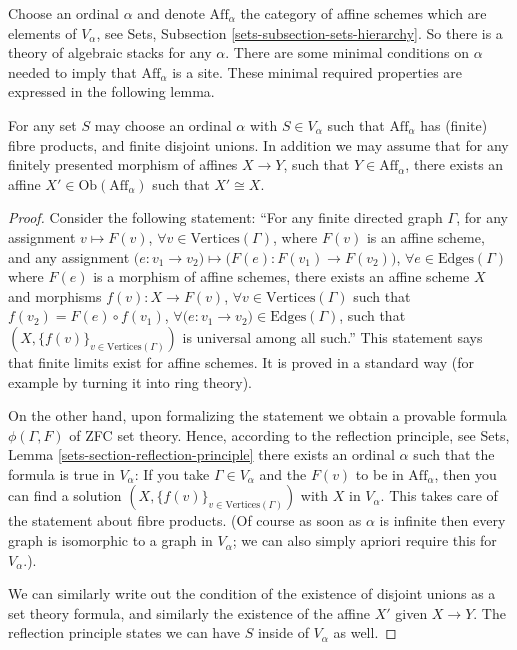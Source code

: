 \noindent
Choose an ordinal $\alpha$ and denote $\text{Aff}_\alpha$ the
category of affine schemes which are elements of $V_\alpha$, see
Sets, Subsection \ref{sets-subsection-sets-hierarchy}. So there is a
theory of algebraic stacks for any $\alpha$. There are some minimal
conditions on $\alpha$ needed to imply that $\text{Aff}_\alpha$ is a site. 
These minimal required properties are expressed in the following lemma.

\begin{lemma}
\label{lemma-Aff-site}
For any set $S$ may choose an ordinal $\alpha$ with $S \in V_\alpha$ 
such that $\text{Aff}_\alpha$ has (finite) fibre products, and finite disjoint
unions. In addition we may assume that for any finitely presented morphism
of affines $X \to Y$, such that $Y \in \text{Aff}_\alpha$, there exists
an affine $X' \in \text{Ob}(\text{Aff}_\alpha)$ such that $X' \cong X$.
\end{lemma}

\begin{proof}
Consider the following statement: ``For any finite directed graph $\Gamma$,
for any assignment $v \mapsto F(v)$, $\forall v\in \text{Vertices}(\Gamma)$,
where $F(v)$ is an affine scheme, and any assignment
$\big(e : v_1 \to v_2\big) \mapsto \big(F(e) : F(v_1) \to F(v_2)\big)$,
$\forall e \in \text{Edges}(\Gamma)$ where $F(e)$ is a morphism of affine
schemes, there exists an affine scheme $X$ and morphisms $f(v) : X \to F(v)$,
$\forall v\in \text{Vertices}(\Gamma)$ such that $f(v_2) = F(e) \circ f(v_1)$,
$\forall \big(e : v_1 \to v_2\big) \in \text{Edges}(\Gamma)$, such that
$(X, \{f(v)\}_{v\in \text{Vertices}(\Gamma)})$ is universal among all such.''
This statement says that finite limits exist for affine schemes. It is
proved in a standard way (for example by turning it into ring theory).

\smallskip\noindent
On the other hand, upon formalizing the statement we obtain a provable
formula $\phi(\Gamma, F)$ of ZFC set theory. Hence, according to the reflection
principle, see Sets, Lemma \ref{sets-section-reflection-principle}
there exists an ordinal $\alpha$ such that the formula is true in
$V_\alpha$: If you take $\Gamma \in V_\alpha$ and the $F(v)$ to be in
$\text{Aff}_\alpha$, then you can find a solution
$(X, \{f(v)\}_{v\in \text{Vertices}(\Gamma)})$
with $X$ in $V_\alpha$. This takes care of the statement about fibre 
products. (Of course as soon as $\alpha$ is infinite then every
graph is isomorphic to a graph in $V_\alpha$; we can also simply apriori
require this for $V_\alpha$.).

\smallskip\noindent
We can similarly write out the condition of the existence of disjoint unions
as a set theory formula, and similarly the existence of the affine $X'$
given $X \to Y$. The reflection principle states we can have $S$ inside of
$V_\alpha$ as well.
\end{proof}

